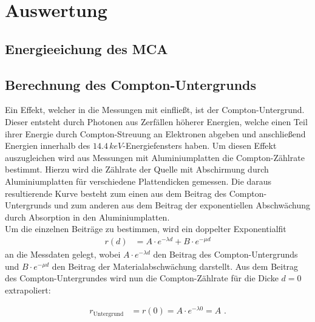 \section{Auswertung}

\subsection{Energieeichung des MCA}



\subsection{Berechnung des Compton-Untergrunds}

Ein Effekt, welcher in die Messungen mit einfließt, ist der Compton-Untergrund. Dieser entsteht durch Photonen aus Zerfällen höherer Energien, welche einen Teil ihrer Energie durch Compton-Streuung an Elektronen abgeben und anschließend Energien innerhalb des $14.4\,\si{keV}$-Energiefensters haben. Um diesen Effekt auszugleichen wird aus Messungen mit Aluminiumplatten die Compton-Zählrate bestimmt. Hierzu wird die Zählrate der Quelle mit Abschirmung durch Aluminiumplatten für verschiedene Plattendicken gemessen. Die daraus resultierende Kurve besteht zum einen aus dem Beitrag des Compton-Untergrunds und zum anderen aus dem Beitrag der exponentiellen Abschwächung durch Absorption in den Aluminiumplatten.\\

Um die einzelnen Beiträge zu bestimmen, wird ein doppelter Exponentialfit
\begin{align}
	r(d)&=A\cdot e^{-\lambda d}+B\cdot e^{-\mu d}
\end{align}
an die Messdaten gelegt, wobei $A\cdot e^{-\lambda d}$ den Beitrag des Compton-Untergrunds und $B\cdot e^{-\mu d}$ den Beitrag der Materialabschwächung darstellt. Aus dem Beitrag des Compton-Untergrundes wird nun die Compton-Zählrate für die Dicke $d=0$ extrapoliert:

\begin{align}
	r_\text{Untergrund}&=r(0)=A\cdot e^{-\lambda 0}=A\text{ .}\label{eq:dexpfit}
\end{align}


